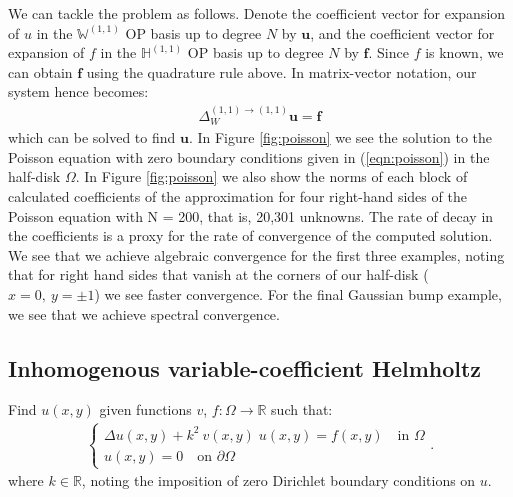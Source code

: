 \documentclass[11pt, oneside]{article}   	%
\newcommand{\R}{\mathbb{R}}
\newcommand{\hdop}{H}
\newcommand{\bighdopii}{{\mathbb{\hdop}^{(1,1)}}}
\newcommand{\laplacewii}{\Delta_W^{(1,1)\to(1,1)}}
\newcommand{\bigWii}{{\mathbb{W}^{(1,1)}}}
\begin{document}
We can tackle the problem as follows. Denote the coefficient vector for expansion of $u$ in the $\bigWii$ OP basis up to degree $N$ by $\mathbf{u}$, and the coefficient vector for expansion of $f$ in the $\bighdopii$ OP basis up to degree $N$ by $\mathbf{f}$. Since $f$ is known, we can obtain $\mathbf{f}$ using the quadrature rule above. In matrix-vector notation, our system hence becomes:
\begin{align*}
    \laplacewii \mathbf{u} = \mathbf{f}
\end{align*}
which can be solved to find $\mathbf{u}$.
In Figure \ref{fig:poisson} we see the solution to the Poisson equation with zero boundary conditions given in (\ref{eqn:poisson}) in the half-disk $\Omega$. In Figure \ref{fig:poisson} we also show the norms of each block of calculated coefficients of the approximation for four right-hand sides of the Poisson equation with N = 200, that is, 20,301 unknowns. The rate of decay in the coefficients is a proxy for the rate of convergence of the computed solution. We see that we achieve algebraic convergence for the first three examples, noting that for right hand sides that vanish at the corners of our half-disk ($x=0, \: y = \pm 1$) we see faster convergence. For the final Gaussian bump example, we see that we achieve spectral convergence.

\subsection{Inhomogenous variable-coefficient Helmholtz}

Find \(u(x,y)\) given functions $v$, $f : \Omega \to \R$ such that:
\begin{align}
	\begin{cases}
    		\Delta u(x,y) + k^2 \: v(x,y) \; u(x,y) = f(x,y) \quad \text{in } \Omega \\
		u(x,y) = 0 \quad \text{on } \partial \Omega
	\end{cases}.
	\label{eqn:helmholtz}
\end{align}
where $k \in \R$, noting the imposition of zero Dirichlet boundary conditions on $u$.
\end{document}
